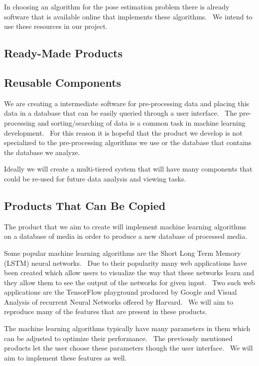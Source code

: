 \documentclass{scrreprt}
\begin{document}
{In choosing an algorithm for the pose estimation problem there is
already software that is available online that implements these
algorithms. ~We intend to use these resources in our project.}

\subsection{Ready-Made Products}

\subsection{Reusable Components}

{We are creating a intermediate software for pre-processing data and
placing this data in a database that can be easily queried through a
user interface. ~The pre-processing and sorting/searching of data is a
common task in machine learning development. ~For this reason it is
}{hopeful that the product we develop is not specialized to the
pre-processing algorithms we use or the database that contains the
database we analyze. ~}

{Ideally we will create a multi-tiered system that will have many
components that could be re-used for future data analysis and viewing
tasks.}

\subsection{Products That Can Be Copied}

{The product that we aim to create will implement machine learning
algorithms on a database of media in order to produce a new database of
processed media. ~}

{Some popular machine learning algorithms are the Short Long Term Memory
(LSTM) neural networks. ~Due to their popularity many web applications
have been created which allow users to visualize the way that these
networks learn and they allow them to see the output of the networks for
given input. ~Two such web applications are the TensorFlow playground
produced by Google and Visual Analysis of recurrent Neural Networks
offered by Harvard. ~We will aim to reproduce many of the features that
are present in these products. }

{The machine learning algorithms typically have many parameters in them
which can be adjusted to optimize their performance. ~The previously
mentioned products let the user choose these parameters though the user
interface. ~We will aim to implement these features as well.}
\end{document}
